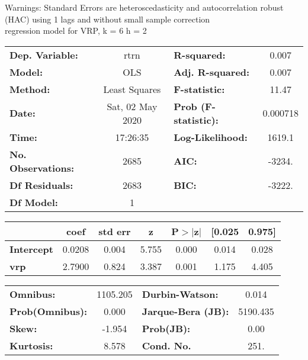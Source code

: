 Warnings: \newline
 [1] Standard Errors are heteroscedasticity and autocorrelation robust (HAC) using 1 lags and without small sample correction\\ 

regression model for VRP, k = 6 h = 2\begin{center}
\begin{tabular}{lclc}
\toprule
\textbf{Dep. Variable:}    &       rtrn       & \textbf{  R-squared:         } &     0.007   \\
\textbf{Model:}            &       OLS        & \textbf{  Adj. R-squared:    } &     0.007   \\
\textbf{Method:}           &  Least Squares   & \textbf{  F-statistic:       } &     11.47   \\
\textbf{Date:}             & Sat, 02 May 2020 & \textbf{  Prob (F-statistic):} &  0.000718   \\
\textbf{Time:}             &     17:26:35     & \textbf{  Log-Likelihood:    } &    1619.1   \\
\textbf{No. Observations:} &        2685      & \textbf{  AIC:               } &    -3234.   \\
\textbf{Df Residuals:}     &        2683      & \textbf{  BIC:               } &    -3222.   \\
\textbf{Df Model:}         &           1      & \textbf{                     } &             \\
\bottomrule
\end{tabular}
\begin{tabular}{lcccccc}
                   & \textbf{coef} & \textbf{std err} & \textbf{z} & \textbf{P$> |$z$|$} & \textbf{[0.025} & \textbf{0.975]}  \\
\midrule
\textbf{Intercept} &       0.0208  &        0.004     &     5.755  &         0.000        &        0.014    &        0.028     \\
\textbf{vrp}       &       2.7900  &        0.824     &     3.387  &         0.001        &        1.175    &        4.405     \\
\bottomrule
\end{tabular}
\begin{tabular}{lclc}
\textbf{Omnibus:}       & 1105.205 & \textbf{  Durbin-Watson:     } &    0.014  \\
\textbf{Prob(Omnibus):} &   0.000  & \textbf{  Jarque-Bera (JB):  } & 5190.435  \\
\textbf{Skew:}          &  -1.954  & \textbf{  Prob(JB):          } &     0.00  \\
\textbf{Kurtosis:}      &   8.578  & \textbf{  Cond. No.          } &     251.  \\
\bottomrule
\end{tabular}
\end{center}

